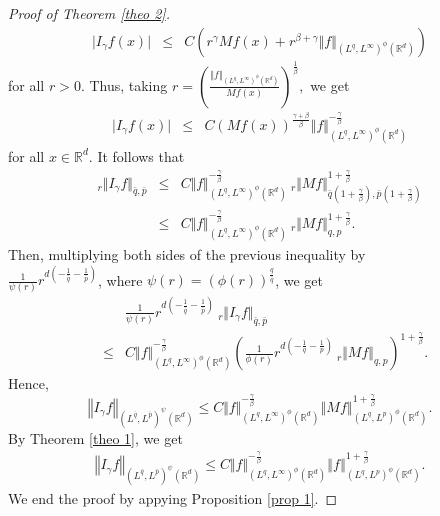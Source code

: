 \documentclass[a4paper,12pt,intlimits,oneside]{amsart}
\numberwithin{equation}{section}
\numberwithin{equation}{section}
\theoremstyle{definition}
\begin{document}
\begin{proof}[Proof of Theorem \ref{theo 2}]
\begin{eqnarray*}
\vert I_{\gamma} f(x) \vert &\leq& C\left(r^{\gamma} M f(x)+r^{\beta +\gamma}\Vert f \Vert_{(L^{q},L^{\infty})^{\phi}(\mathbb{R}^{d})}\right)
\end{eqnarray*}
for all $ r > 0 $. Thus, taking $r = \left( \frac{\Vert f \Vert_{(L^{q},L^{\infty})^{\phi}(\mathbb{R}^{d})}}{Mf(x)}         \right)^{\frac{1}{\beta}},$ we get 
\begin{eqnarray*}
\label{rel 33}
\vert I_{\gamma} f(x) \vert &\leq& C (Mf(x))^{\frac{\gamma + \beta }{\beta}} \Vert f \Vert^{-\frac{\gamma}{\beta}}_{(L^{q},L^{\infty})^{\phi}(\mathbb{R}^{d})}
\end{eqnarray*}
for all $ x \in \mathbb{R}^{d}$. It follows that 
\begin{eqnarray*}
_{r}\Vert I_{\gamma} f \Vert_{\bar{q},\bar{p}} &\leq& C\Vert f \Vert^{-\frac{\gamma}{\beta}}_{(L^{q},L^{\infty})^{\phi}(\mathbb{R}^{d})}\:_{r}\Vert M f \Vert^{1+ \frac{\gamma}{\beta}}_{\bar{q}(1+ \frac{\gamma}{\beta}),\bar{p}(1+ \frac{\gamma}{\beta})}\\
&\leq& C\Vert f \Vert^{-\frac{\gamma}{\beta}}_{(L^{q},L^{\infty})^{\phi}(\mathbb{R}^{d})}\:_{r}\Vert M f \Vert^{1+ \frac{\gamma}{\beta}}_{q,p}.
\end{eqnarray*}
Then, multiplying both sides of the previous inequality by\\ $ \frac{1}{\psi(r)} r^{d(-\frac{1}{\bar{q}}-\frac{1}{\bar{p}})} $, where  $\psi(r)= (\phi(r))^{\frac{q}{\bar{q}}}$, we get 
\begin{eqnarray*}
&&\frac{1}{\psi(r)} r^{d(-\frac{1}{\bar{q}}-\frac{1}{\bar{p}})} \:_{r}\Vert I_{\gamma} f \Vert_{\bar{q},\bar{p}} \\ &\leq& C\Vert f \Vert^{-\frac{\gamma}{\beta}}_{(L^{q},L^{\infty})^{\phi}(\mathbb{R}^{d})}    \left(  \frac{1}{\phi(r)} r^{d(-\frac{1}{q}-\frac{1}{p})}\:_{r}\Vert M f \Vert_{q,p}  \right)^{1+ \frac{\gamma}{\beta}}.
\end{eqnarray*}
Hence,  $$\left\Vert I_{\gamma}f \right\Vert_{(L^{\bar{q}},L^{\bar{p}})^{\psi}(\mathbb{R}^{d})} \leq C\Vert f \Vert^{-\frac{\gamma}{\beta}}_{(L^{q},L^{\infty})^{\phi}(\mathbb{R}^{d})} \left\Vert Mf  \right\Vert^{1+ \frac{\gamma}{\beta}}_{(L^{q},L^{p})^{\phi}(\mathbb{R}^{d})}.$$
By Theorem \ref{theo 1}, we get 
\begin{eqnarray*}
\label{rel 44}
\left\Vert I_{\gamma}f \right\Vert_{(L^{\bar{q}},L^{\bar{p}})^{\psi}(\mathbb{R}^{d})} \leq C\Vert f \Vert^{-\frac{\gamma}{\beta}}_{(L^{q},L^{\infty})^{\phi}(\mathbb{R}^{d})} \left\Vert f  \right\Vert^{1+ \frac{\gamma}{\beta}}_{(L^{q},L^{p})^{\phi}(\mathbb{R}^{d})}.
\end{eqnarray*}
We end the proof by appying Proposition \ref{prop 1}.
\end{proof}
\end{document}
